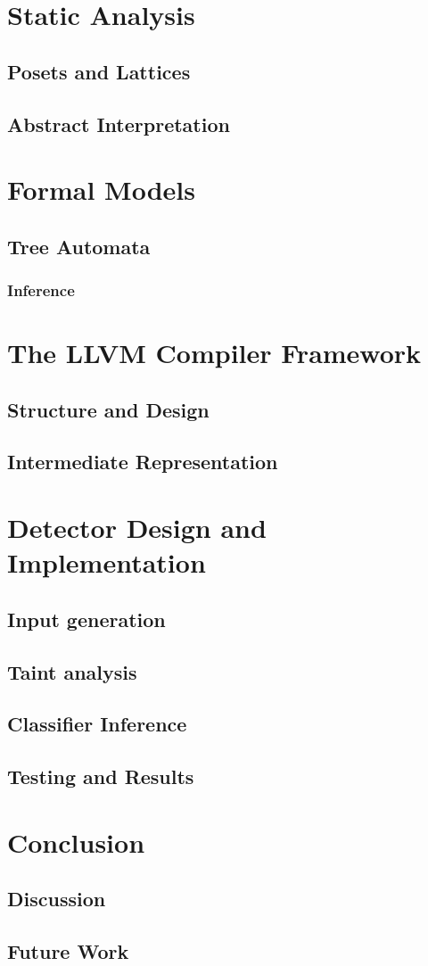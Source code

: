 \chapter{Static Analysis}
\label{ch_s_analysis}
    \section{Posets and Lattices}
    \section{Abstract Interpretation}
\chapter{Formal Models}
\label{ch_models}
    \section{Tree Automata}
        \subsection{Inference}
\chapter{The LLVM Compiler Framework}
\label{ch_llvm}
    \section{Structure and Design}
    \section{Intermediate Representation}
\chapter{Detector Design and Implementation}
\label{ch_detector}
    \section{Input generation}
    \section{Taint analysis}
    \section{Classifier Inference}
    \section{Testing and Results}
\chapter{Conclusion}
\label{ch_conclusion}
    \section{Discussion}
    \section{Future Work}

